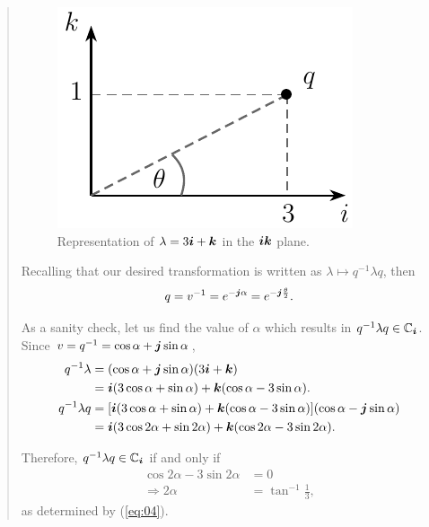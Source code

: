 \begin{quotation}
\begin{example}
\begin{figure}
\centering
\includegraphics[width=0.25\linewidth]{Figures/quaternion01.pdf}
\caption{Representation of $ \lambda = 3\boldsymbol{i} + \boldsymbol{k} $ in the $ \boldsymbol{i} \boldsymbol{k} $ plane.}
\label{fig:quat3ik}
\end{figure}

Recalling that our desired transformation is written as $ \lambda \mapsto q^{-1} \lambda q $, then
\begin{equation}
q = v^{-1} = e^{- \boldsymbol{j} \alpha} = e^{- \boldsymbol{j} \frac{\theta}{2}}.
\end{equation}

As a sanity check, let us find the value of $ \alpha $ which results in $ q^{-1} \lambda q \in \mathbb{C}_{\boldsymbol{i}} $. Since $ v = q^{-1} = \cos \alpha + \boldsymbol{j} \sin \alpha $,
\begin{equation}
\begin{aligned}
q^{-1} \lambda &= (\cos \alpha + \boldsymbol{j} \sin \alpha)(3 \boldsymbol{i} + \boldsymbol{k})\\
&= \boldsymbol{i}(3 \cos \alpha + \sin \alpha) + \boldsymbol{k}(\cos \alpha - 3 \sin \alpha). \\
q^{-1} \lambda q &= [\boldsymbol{i}(3 \cos \alpha + \sin \alpha) + \boldsymbol{k}(\cos \alpha - 3 \sin \alpha)] (\cos \alpha - \boldsymbol{j} \sin \alpha) \\
&= \boldsymbol{i} (3 \cos 2\alpha + \sin 2\alpha) + \boldsymbol{k}(\cos 2\alpha - 3 \sin 2\alpha).
\end{aligned}
\end{equation}

Therefore, $ q^{-1} \lambda q \in \mathbb{C}_{\boldsymbol{i}} $ if and only if
\begin{equation}
\begin{aligned}\textbf{}
\cos 2\alpha - 3 \sin 2\alpha &= 0 \\
\Rightarrow 2\alpha &= \tan^{-1} \frac{1}{3},
\end{aligned}
\end{equation}
as determined by (\ref{eq:04}).


\end{example}
\end{quotation}
